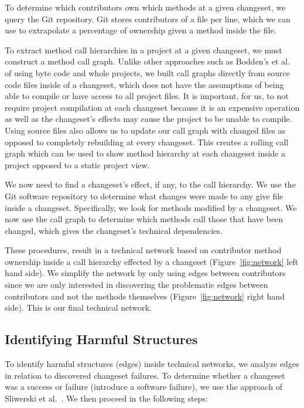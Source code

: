 \documentclass[conference]{IEEEtran}
\begin{document}
To determine which contributors own which methods at a given changeset, we query
the Git repository. Git stores contributors of a file per line, which we can use to extrapolate
a percentage of ownership given a method inside the file.

To extract method call hierarchies in a project at a given changeset, we must construct
a method call graph. Unlike other approaches such as Bodden's et al.~\cite{Bodden:2003:HVJ} 
of using byte code and whole projects, we built call graphs directly from source code files
inside of a changeset, 
which does not have the assumptions of being able to compile or have access to all project 
files. It is important, for us, to not require project compilation at each changeset because it is
an expensive operation as well as the changeset's effects may cause the project
to be unable to compile. Using source files also allows us to update our call graph
with changed files as opposed to completely rebuilding at 
every changeset. This creates a rolling call graph which 
can be used to show method hierarchy at each changeset inside a project opposed to
a static project view.

We now need to find a changeset's effect, if any, to the call hierarchy. We use the Git
software repository to determine what changes were made to any give file inside a 
changeset. Specifically, we look for methods modified by a changeset. We now use
the call graph to determine which methods call those that have been changed, which
gives the changeset's technical dependencies.

These procedures, result in a technical network based on contributor method ownership 
inside a call hierarchy effected by a changeset (Figure~\ref{fig:network} left hand side).
We simplify the network by only using edges between contributors since we 
are only interested in discovering the problematic edges between contributors and not the 
methods themselves (Figure~\ref{fig:network} right hand side). This is our final technical 
network.

\subsection{Identifying Harmful Structures}
To identify harmful structures (edges) inside technical networks, we analyze 
edges in relation to discovered changeset failures. To determine whether a changeset 
was a success or failure (introduce a software failure), we use the approach of
Sliwerski et al.~\cite{Sliwerski:2005:CIF}. We then proceed in the following steps:
\end{document}
